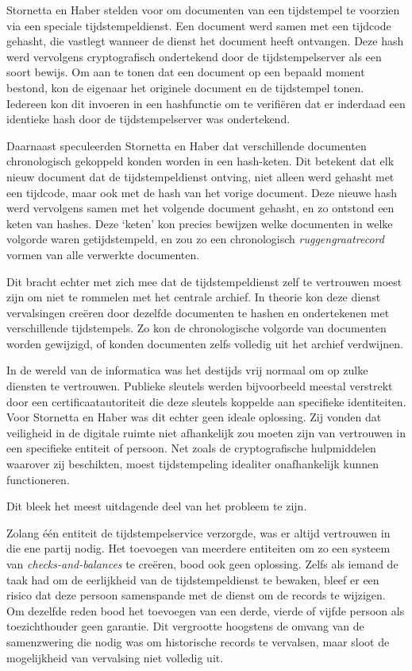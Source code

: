 \documentclass[
  a5paper,
  smalldemyvopaper,11pt,twoside,onecolumn,openright,extrafontsizes,
hidelinks]{memoir}
\begin{document}
Stornetta en Haber stelden voor om documenten van een tijdstempel te
voorzien via een speciale tijdstempeldienst. Een document werd samen met
een tijdcode gehasht, die vastlegt wanneer de dienst het document heeft
ontvangen. Deze hash werd vervolgens cryptografisch ondertekend door de
tijdstempelserver als een soort bewijs. Om aan te tonen dat een document
op een bepaald moment bestond, kon de eigenaar het originele document en
de tijdstempel tonen. Iedereen kon dit invoeren in een hashfunctie om te
verifiëren dat er inderdaad een identieke hash door de tijdstempelserver
was ondertekend.

Daarnaast speculeerden Stornetta en Haber dat verschillende documenten
chronologisch gekoppeld konden worden in een hash-keten. Dit betekent
dat elk nieuw document dat de tijdstempeldienst ontving, niet alleen
werd gehasht met een tijdcode, maar ook met de hash van het vorige
document. Deze nieuwe hash werd vervolgens samen met het volgende
document gehasht, en zo ontstond een keten van hashes. Deze `keten' kon
precies bewijzen welke documenten in welke volgorde waren
getijdstempeld, en zou zo een chronologisch \emph{ruggengraatrecord}
vormen van alle verwerkte documenten.

Dit bracht echter met zich mee dat de tijdstempeldienst zelf te
vertrouwen moest zijn om niet te rommelen met het centrale archief. In
theorie kon deze dienst vervalsingen creëren door dezelfde documenten te
hashen en ondertekenen met verschillende tijdstempels. Zo kon de
chronologische volgorde van documenten worden gewijzigd, of konden
documenten zelfs volledig uit het archief verdwijnen.

In de wereld van de informatica was het destijds vrij normaal om op
zulke diensten te vertrouwen. Publieke sleutels werden bijvoorbeeld
meestal verstrekt door een certificaatautoriteit die deze sleutels
koppelde aan specifieke identiteiten. Voor Stornetta en Haber was dit
echter geen ideale oplossing. Zij vonden dat veiligheid in de digitale
ruimte niet afhankelijk zou moeten zijn van vertrouwen in een specifieke
entiteit of persoon. Net zoals de cryptografische hulpmiddelen waarover
zij beschikten, moest tijdstempeling idealiter onafhankelijk kunnen
functioneren.

Dit bleek het meest uitdagende deel van het probleem te zijn.

Zolang één entiteit de tijdstempelservice verzorgde, was er altijd
vertrouwen in die ene partij nodig. Het toevoegen van meerdere
entiteiten om zo een systeem van \emph{checks-and-balances} te creëren,
bood ook geen oplossing. Zelfs als iemand de taak had om de eerlijkheid
van de tijdstempeldienst te bewaken, bleef er een risico dat deze
persoon samenspande met de dienst om de records te wijzigen. Om dezelfde
reden bood het toevoegen van een derde, vierde of vijfde persoon als
toezichthouder geen garantie. Dit vergrootte hoogstens de omvang van de
samenzwering die nodig was om historische records te vervalsen, maar
sloot de mogelijkheid van vervalsing niet volledig uit.
\end{document}
